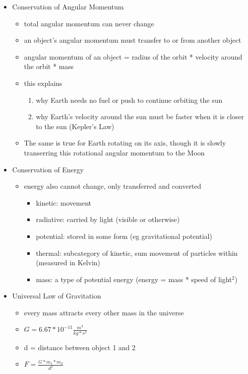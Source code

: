 \begin{itemize}
\item Conservation of Angular Momentum
\begin{itemize}
\item total angular momentum can never change
\item an object's angular momentum must transfer to or from another object
\item angular momentum of an object = radius of the orbit * velocity around the orbit * mass
\item this explains
\begin{enumerate}
\item why Earth needs no fuel or push to continue orbiting the sun
\item why Earth's velocity around the sun must be faster when it is closer to the sun (Kepler's Law)
\end{enumerate}
\item The same is true for Earth rotating on its axis, though it is slowly transerring this rotational angular momentum to the Moon
\end{itemize}
\item Conservation of Energy
\begin{itemize}
\item energy also cannot change, only transferred and converted
\begin{itemize}
\item kinetic: movement
\item radiative: carried by light (visible or otherwise)
\item potential: stored in some form (eg gravitational potential)
\item thermal: subcategory of kinetic, sum movement of particles within (measured in Kelvin)
\item mass: a type of potential energy  (energy = mass * speed of light$^2$)
\end{itemize}
\end{itemize}
\item Universal Law of Gravitation
\begin{itemize}
\item every mass attracts every other mass in the universe
\item $G = 6.67*10^{-11} \frac{m^3}{kg*s^2}$
\item d = distance between object 1 and 2
\item $F = \frac{G*m_1*m_2}{d^2}$
\end{itemize}
\end{itemize}

